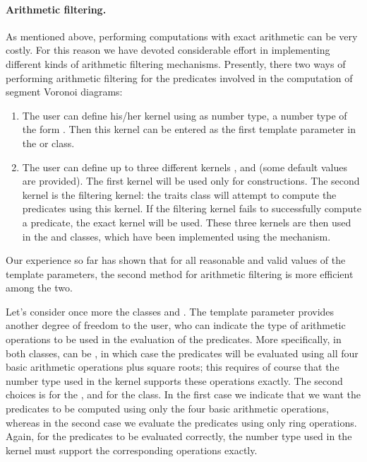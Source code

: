 \paragraph{Arithmetic filtering.}
As mentioned above, performing computations with exact arithmetic
can be very costly. For this reason we have devoted considerable
effort in implementing different kinds of arithmetic filtering
mechanisms. Presently, there two ways of performing arithmetic
filtering for the predicates involved in the computation of
segment Voronoi diagrams:
\begin{enumerate}
\item The user can define his/her kernel using as number type, a
  number type of the form . Then this
  kernel can be entered as the first template parameter in the
   or
   class.
\item The user can define up to three different kernels ,
   and  (some default values are provided). The first
  kernel  will be used only for constructions. The second
  kernel  is the filtering kernel: the traits class will
  attempt to compute the predicates using this kernel. If the
  filtering kernel fails to successfully compute a predicate, the
  exact kernel  will be used. These three kernels are then
  used in the 
   and
  classes, which have been implemented using the
   mechanism.
\end{enumerate}
Our experience so far has shown that for all reasonable and valid
values of the template parameters, the second method for arithmetic
filtering is more efficient among the two.

Let's consider once more the classes
 and 
.
The template parameter  provides another degree of freedom
to the user, who can indicate the type of arithmetic operations to
be used in the evaluation of the predicates. More specifically, in
both classes,  can be , in
which case the predicates will be evaluated using all four basic
arithmetic operations plus square roots; this requires of course
that the number type used in the kernel  supports these
operations exactly. The second choices is  for
the , and 
for the 
class. In the first case we indicate that we want the predicates to be
computed using only the four basic arithmetic operations, whereas in
the second case we evaluate the predicates using only ring operations.
Again, for the predicates to be evaluated correctly, the number type
used in the kernel  must support the corresponding operations
exactly.

